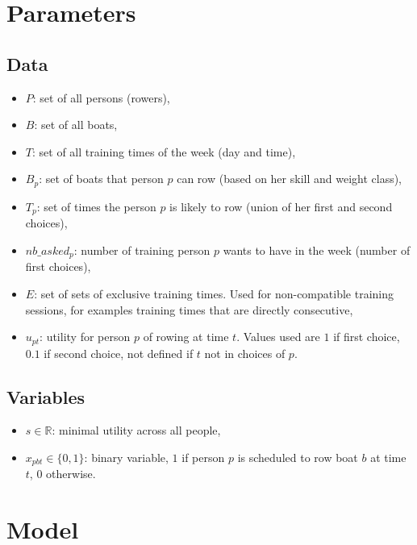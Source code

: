 \documentclass[12pt]{extarticle}
\begin{document}
\section{Parameters}%
\label{sec:Parameters}

\subsection{Data}
\label{sub:Data}
\begin{itemize}
	\item $P$: set of all persons (rowers),
	\item $B$: set of all boats,
	\item $T$: set of all training times of the week (day and time),
	\item $B_p$: set of boats that person $p$ can row (based on her skill and weight class),
	\item $T_p$: set of times the person $p$ is likely to row (union of her first and second choices),
	\item $nb\_asked_p$: number of training person $p$ wants to have in the week (number of first choices),
	\item $E$: set of sets of exclusive training times. Used for non-compatible training sessions, for examples training times that are directly consecutive,
	\item $u_{pt}$: utility for person $p$ of rowing at time $t$. Values used are $1$ if first choice, $0.1$ if second choice, not defined if $t$ not in choices of $p$.
\end{itemize}

\subsection{Variables}%
\label{sub:Variables}
\begin{itemize}
	\item $s \in \mathbb{R}$: minimal utility across all people,
	\item $x_{pbt} \in \{0, 1\}$: binary variable, $1$ if person $p$ is scheduled to row boat $b$ at time $t$, $0$ otherwise.
\end{itemize}


\section{Model}%
\label{sec:Model}
\end{document}
